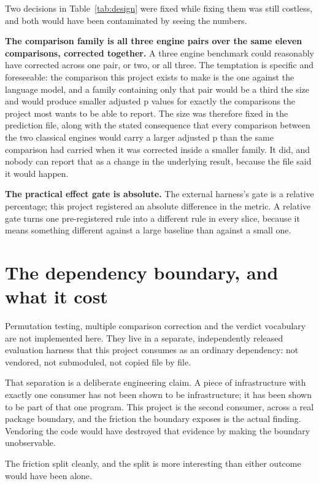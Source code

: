 Two decisions in Table~\ref{tab:design} were fixed while fixing them was still
costless, and both would have been contaminated by seeing the numbers.

\textbf{The comparison family is all three engine pairs over the same eleven
comparisons, corrected together.} A three engine benchmark could reasonably have
corrected across one pair, or two, or all three. The temptation is specific and
foreseeable: the comparison this project exists to make is the one against the
language model, and a family containing only that pair would be a third the size
and would produce smaller adjusted p values for exactly the comparisons the
project most wants to be able to report. The size was therefore fixed in the
prediction file, along with the stated consequence that every comparison between
the two classical engines would carry a larger adjusted p than the same
comparison had carried when it was corrected inside a smaller family. It did, and
nobody can report that as a change in the underlying result, because the file
said it would happen.

\textbf{The practical effect gate is absolute.} The external harness's gate is a
relative percentage; this project registered an absolute difference in the
metric. A relative gate turns one pre-registered rule into a different rule in
every slice, because it means something different against a large baseline than
against a small one.

\section{The dependency boundary, and what it cost}

Permutation testing, multiple comparison correction and the verdict vocabulary
are not implemented here. They live in a separate, independently released
evaluation harness \cite{triage} that this project consumes as an ordinary
dependency: not vendored, not submoduled, not copied file by file.

That separation is a deliberate engineering claim. A piece of infrastructure
with exactly one consumer has not been shown to be infrastructure; it has been
shown to be part of that one program. This project is the second consumer, across
a real package boundary, and the friction the boundary exposes is the actual
finding. Vendoring the code would have destroyed that evidence by making the
boundary unobservable.

The friction split cleanly, and the split is more interesting than either
outcome would have been alone.

